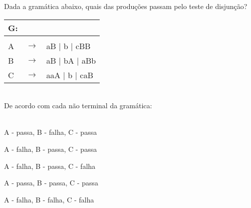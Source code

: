 \question[10] 

Dada a gramática abaixo, quais das produções passam pelo teste de disjunção?\\
\begin{tabular}{|l c l}
	G: & & \\
	\hline \\
	A & $\rightarrow$ & aB | b | cBB \\
    B & $\rightarrow$ & aB | bA | aBb \\
	C & $\rightarrow$ & aaA | b | caB \\
\end{tabular}
\\
De acordo com cada não terminal da gramática:\\
\\
\begin{choices}
\item A - passa, B - falha, C - passa %
\item A - falha, B - passa, C - passa
\item A - falha, B - passa, C - falha
\item A - passa, B - passa, C - passa
\item A - falha, B - falha, C - falha
\end{choices}
\answerline

